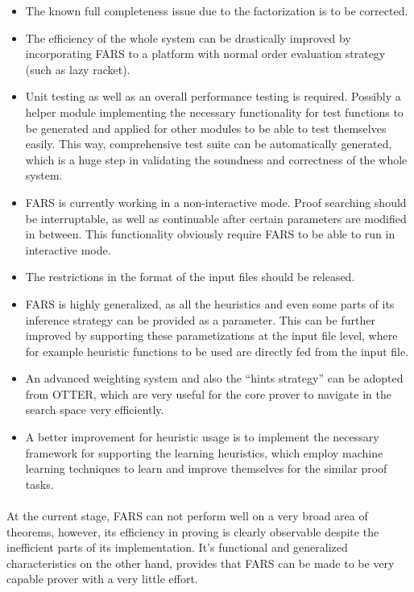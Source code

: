 \documentclass[11pt]{report}
\begin{document}
\begin{itemize}
 \item The known full completeness issue due to the factorization is to be corrected.
 \item The efficiency of the whole system can be drastically improved by incorporating FARS to a platform with normal order evaluation strategy (such as lazy racket).
 \item Unit testing as well as an overall performance testing is required. Possibly a helper module implementing the necessary functionality for test functions to be generated and applied for other modules to be able to test themselves easily. This way, comprehensive test suite can be automatically generated, which is a huge step in validating the soundness and correctness of the whole system.
 \item FARS is currently working in a non-interactive mode. Proof searching should be interruptable, as well as continuable after certain parameters are modified in between. This functionality obviously require FARS to be able to run in interactive mode.
 \item The restrictions in the format of the input files should be released.
 \item FARS is highly generalized, as all the heuristics and even some parts of its inference strategy can be provided as a parameter. This can be further improved by supporting these parametizations at the input file level, where for example heuristic functions to be used are directly fed from the input file.
 \item An advanced weighting system and also the ``hints strategy'' can be adopted from OTTER, which are very useful for the core prover to navigate in the search space very efficiently.
 \item A better improvement for heuristic usage is to implement the necessary framework for supporting the learning heuristics, which employ machine learning techniques to learn and improve themselves for the similar proof tasks.
\end{itemize}

\paragraph{} At the current stage, FARS can not perform well on a very broad area of theorems, however, its efficiency in proving is clearly observable despite the inefficient parts of its implementation. It's functional and generalized characteristics on the other hand, provides that FARS can be made to be very capable prover with a very little effort.
\end{document}
